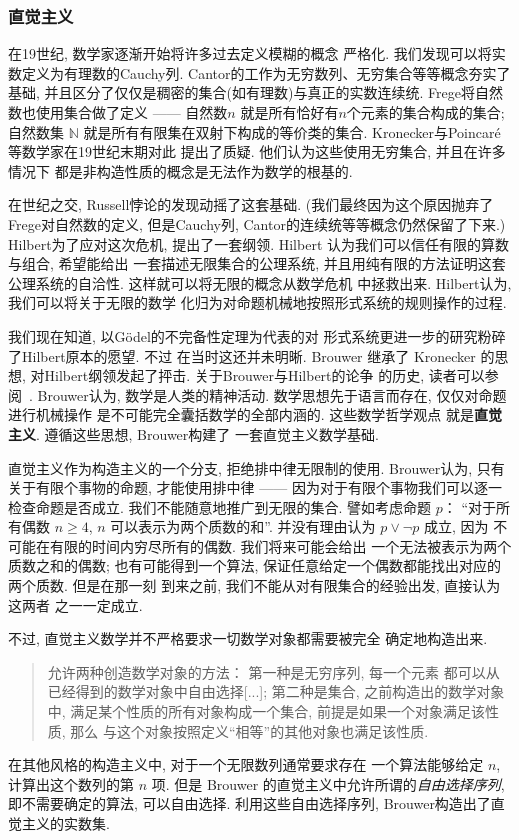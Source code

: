 \documentclass[UTF8]{ctexbook}
\theoremstyle{plain}
\theoremstyle{definition}
\theoremstyle{remark}
\begin{document}
\subsubsection{直觉主义}

在19世纪, 数学家逐渐开始将许多过去定义模糊的概念
严格化. 我们发现可以将实数定义为有理数的Cauchy列.
Cantor的工作为无穷数列、无穷集合等等概念夯实了基础,
并且区分了仅仅是稠密的集合(如有理数)与真正的实数连续统.
Frege将自然数也使用集合做了定义 ------ 自然数\(n\)
就是所有恰好有\(n\)个元素的集合构成的集合; 自然数集
\(\mathbb N\) 就是所有有限集在双射下构成的等价类的集合.
Kronecker与Poincar\'e等数学家在19世纪末期对此
提出了质疑. 他们认为这些使用无穷集合, 并且在许多情况下
都是非构造性质的概念是无法作为数学的根基的.

在世纪之交, Russell悖论的发现动摇了这套基础.
(我们最终因为这个原因抛弃了Frege对自然数的定义,
但是Cauchy列, Cantor的连续统等等概念仍然保留了下来.)
Hilbert为了应对这次危机, 提出了一套纲领. Hilbert
认为我们可以信任有限的算数与组合, 希望能给出
一套描述无限集合的公理系统, 并且用纯有限的方法证明这套
公理系统的自洽性. 这样就可以将无限的概念从数学危机
中拯救出来. Hilbert认为, 我们可以将关于无限的数学
化归为对命题机械地按照形式系统的规则操作的过程.

我们现在知道, 以G\"odel的不完备性定理为代表的对
形式系统更进一步的研究粉碎了Hilbert原本的愿望. 不过
在当时这还并未明晰. Brouwer 继承了 Kronecker 的思想,
对Hilbert纲领发起了抨击. 关于Brouwer与Hilbert的论争
的历史, 读者可以参阅~\cite{carl:1998:brouwer}.
Brouwer认为, 数学是人类的精神活动.
数学思想先于语言而存在, 仅仅对命题进行机械操作
是不可能完全囊括数学的全部内涵的. 这些数学哲学观点
就是\textbf{直觉主义}. 遵循这些思想, Brouwer构建了
一套直觉主义数学基础.

直觉主义作为构造主义的一个分支, 拒绝排中律无限制的使用.
Brouwer认为, 只有关于有限个事物的命题, 才能使用排中律
------ 因为对于有限个事物我们可以逐一检查命题是否成立.
我们不能随意地推广到无限的集合. 譬如考虑命题 \(p\)：
“对于所有偶数 \(n \ge 4\), \(n\) 可以表示为两个质数的和”.
并没有理由认为 \(p \vee \neg p\) 成立, 因为
不可能在有限的时间内穷尽所有的偶数. 我们将来可能会给出
一个无法被表示为两个质数之和的偶数; 也有可能得到一个算法,
保证任意给定一个偶数都能找出对应的两个质数. 但是在那一刻
到来之前, 我们不能从对有限集合的经验出发, 直接认为这两者
之一一定成立.

不过, 直觉主义数学并不严格要求一切数学对象都需要被完全
确定地构造出来.
\begin{quotation}
允许两种创造数学对象的方法： 第一种是无穷序列, 每一个元素
都可以从已经得到的数学对象中自由选择[...]; 第二种是集合,
之前构造出的数学对象中, 满足某个性质的所有对象构成一个集合,
前提是如果一个对象满足该性质, 那么
与这个对象按照定义“相等”的其他对象也满足该性质.~\cite{brouwer:1981:intuitionism}
\end{quotation}
在其他风格的构造主义中, 对于一个无限数列通常要求存在
一个算法能够给定 \(n\), 计算出这个数列的第 \(n\) 项.
但是 Brouwer 的直觉主义中允许所谓的\emph{自由选择序列},
即不需要确定的算法, 可以自由选择. 利用这些自由选择序列,
Brouwer构造出了直觉主义的实数集.
\end{document}
